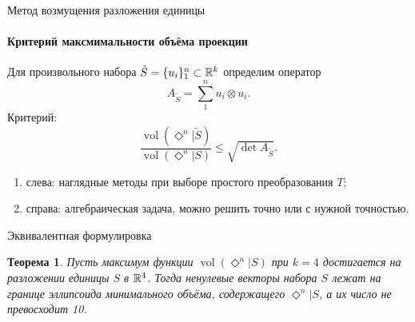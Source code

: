 \documentclass{beamer}
\def\vol{\mathop{vol}}
\newtheorem{thrm}{Теорема}
\newcommand{\crosp}{\Diamond}
\begin{document}
\begin{frame}{Метод возмущения разложения единицы}
	\framesubtitle{Критерий максмимальности объёма проекции}
	Для произвольного набора $\tilde{S}=\{u_i\}_1^n\subset\mathbb {R}^k$ определим оператор
		\begin{equation*}
			A_{\tilde{S}}=\sum_1^n u_i\otimes u_i.
		\end{equation*}\pause
	Критерий:
		\begin{equation*}
			\frac{\vol(\crosp^n|\tilde{S})}{\vol(\crosp^n|S)}\leqslant\sqrt{\det A_{\tilde{S}}}.
		\end{equation*}\pause
		\begin{enumerate}
			\item слева: наглядные методы при выборе простого преобразования $T$;\pause
			\item справа: алгебраическая задача, можно решить точно или с нужной точностью.
		\end{enumerate}
\end{frame}

\begin{frame}{Эквивалентная формулировка}
	\begin{thrm}
		Пусть максимум функции $\vol(\crosp^n|S)$ при $k=4$ достигается на разложении единицы $S$ в $\mathbb {R}^4$. Тогда ненулевые векторы набора $S$ лежат на границе эллипсоида минимального объёма, содержащего $\crosp^n|S$, а их число не превосходит 10.
	\end{thrm}
\end{frame}
\end{document}
